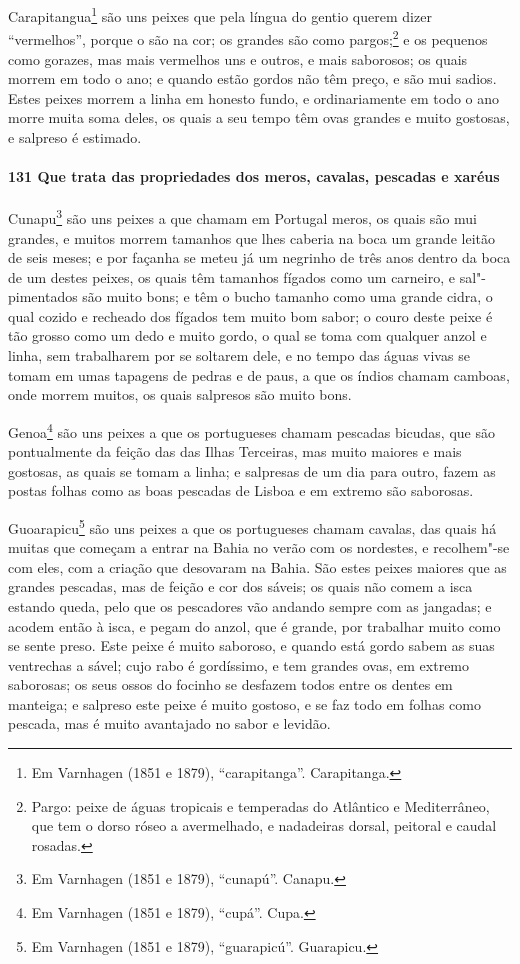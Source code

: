 \begin{linenumbers}
Carapitangua\footnote{ Em Varnhagen (1851 e 1879), ``carapitanga''. Carapitanga.} são uns
peixes que pela língua do gentio querem dizer ``vermelhos'', porque o são na cor; os
grandes são como pargos;\footnote{ Pargo: peixe de águas tropicais e temperadas do
Atlântico e Mediterrâneo, que tem o dorso róseo a avermelhado, e nadadeiras dorsal,
peitoral e caudal rosadas.} e os pequenos como gorazes, mas mais vermelhos uns e outros,
e mais saborosos; os quais morrem em todo o ano; e quando estão gordos não têm preço, e
são mui sadios. Estes peixes morrem a linha em honesto fundo, e ordinariamente em todo o
ano morre muita soma deles, os quais a seu tempo têm ovas grandes e muito gostosas, e
salpreso é estimado.

\paragraph{131 Que trata das propriedades dos meros, cavalas, pescadas e xaréus}\quad
Cunapu\footnote{ Em Varnhagen (1851 e 1879), ``cunapú''. Canapu.} são uns peixes a que
chamam em Portugal meros, os quais são mui grandes, e muitos morrem tamanhos que lhes
caberia na boca um grande leitão de seis meses; e por façanha se meteu já um negrinho de
três anos dentro da boca de um destes peixes, os quais têm tamanhos fígados como um
carneiro, e sal"-pimentados são muito bons; e têm o bucho tamanho como uma grande cidra, o
qual cozido e recheado dos fígados tem muito bom sabor; o couro deste peixe é tão grosso
como um dedo e muito gordo, o qual se toma com qualquer anzol e linha, sem trabalharem por
se soltarem dele, e no tempo das águas vivas se tomam em umas tapagens de pedras e de
paus, a que os índios chamam camboas, onde morrem muitos, os quais salpresos são muito
bons.

Genoa\footnote{ Em Varnhagen (1851 e 1879), ``cupá''. Cupa.} são uns peixes a que os
portugueses chamam pescadas bicudas, que são pontualmente da feição das das Ilhas
Terceiras, mas muito maiores e mais gostosas, as quais se tomam a linha; e salpresas de um
dia para outro, fazem as postas folhas como as boas pescadas de Lisboa e em extremo são
saborosas.

Guoarapicu\footnote{ Em Varnhagen (1851 e 1879), ``guarapicú''. Guarapicu.} são uns peixes
a que os portugueses chamam cavalas, das quais há muitas que começam a entrar na Bahia no
verão com os nordestes, e recolhem"-se com eles, com a criação que desovaram na Bahia. São
estes peixes maiores que as grandes pescadas, mas de feição e cor dos sáveis; os quais não
comem a isca estando queda, pelo que os pescadores vão andando sempre com as jangadas; e
acodem então à isca, e pegam do anzol, que é grande, por trabalhar muito como se sente
preso. Este peixe é muito saboroso, e quando está gordo sabem as suas ventrechas a sável;
cujo rabo é gordíssimo, e tem grandes ovas, em extremo saborosas; os seus ossos do focinho
se desfazem todos entre os dentes em manteiga; e salpreso este peixe é muito gostoso, e se
faz todo em folhas como pescada, mas é muito avantajado no sabor e levidão.


\end{linenumbers}
